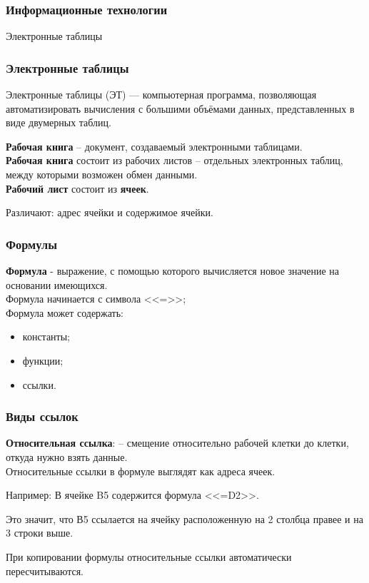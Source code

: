 \begin{frame}
\frametitle{Информационные технологии}

\begin{center}

\Huge
Электронные таблицы
	
\end{center}

\end{frame}


\begin{frame}[fragile]
\frametitle{Электронные таблицы }
Электронные таблицы (ЭТ) --- компьютерная программа, позволяющая автоматизировать вычисления с большими объёмами данных, представленных в виде двумерных таблиц.

\textbf{Рабочая книга} – документ, создаваемый электронными таблицами.\\
\textbf{Рабочая книга} состоит из рабочих листов – отдельных электронных таблиц, между которыми возможен обмен данными. \\
\textbf{Рабочий лист} состоит из \textbf{ячеек}. 

Различают: адрес ячейки и содержимое ячейки.

\end{frame}

\begin{frame}[fragile]
\frametitle{Формулы}
\textbf{Формула} - выражение, с помощью которого вычисляется новое значение на основании имеющихся.\\
Формула начинается с символа <<=>>;\\
Формула может содержать: 
\begin{itemize}
\item константы;
\item функции;
\item ссылки.

\end{itemize}


\end{frame}

\begin{frame}[fragile]
\frametitle{Виды ссылок}
\textbf{Относительная ссылка}: – смещение относительно рабочей клетки до клетки, откуда нужно взять данные. \\
Относительные ссылки в формуле выглядят как адреса ячеек.

Например: В ячейке B5 содержится формула <<=D2>>.

Это значит, что В5 ссылается на ячейку расположенную на 2 столбца правее и на 3 строки выше.

При копировании формулы относительные ссылки автоматически пересчитываются.




\end{frame}

